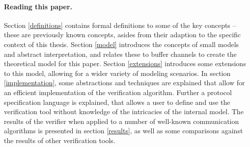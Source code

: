 \paragraph{Reading this paper.} Section \ref{definitions} contains formal definitions to some of the key concepts -- these are previously known concepts, asides from their adaption to the specific context of this thesis. Section \ref{model} introduces the concepts of small models and abstract interpretation, and relates these to buffer channels to create the theoretical model for this paper. Section \ref{extensions} introduces some extensions to this model, allowing for a wider variety of modeling scenarios. In section \ref{implementation}, some abstractions and techniques are explained that allow for an efficient implementation of the verification algorithm. Further a protocol specification language is explained, that allows a user to define and use the verification tool without knowledge of the intricacies of the internal model. The results of the verifier when applied to a number of well-known communication algorithms is presented in section \ref{results}, as well as some comparisons against the results of other verification tools.




